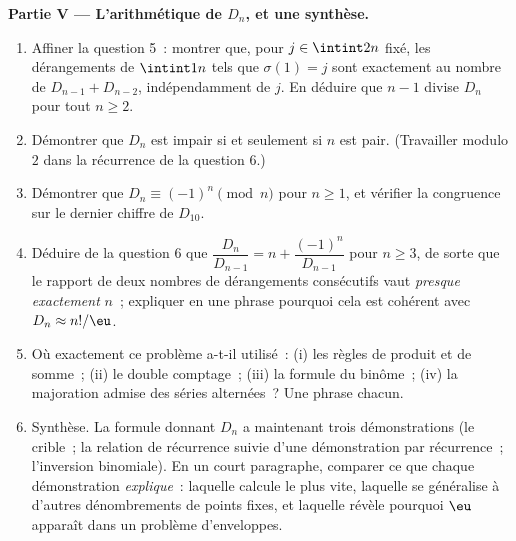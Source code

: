 \begin{problem}
\medskip
\noindent\textbf{Partie V --- L'arithmétique de $D_n$, et une
synthèse.}
\begin{enumerate}[resume]
  \item Affiner la question 5~: montrer que, pour $j \in
        \intint2n$ fixé, les dérangements de $\intint1n$ tels que
        $\sigma(1) = j$ sont exactement au nombre de $D_{n-1} + D_{n-2}$,
        indépendamment de $j$. En déduire que $n - 1$ divise $D_n$
        pour tout $n \geq 2$.
  \item Démontrer que $D_n$ est impair si et seulement si $n$ est pair.
        (Travailler modulo $2$ dans la récurrence de la question 6.)
  \item Démontrer que $D_n \equiv (-1)^n \pmod n$ pour $n \geq 1$, et
        vérifier la congruence sur le dernier chiffre de $D_{10}$.
  \item Déduire de la question 6 que $\dfrac{D_n}{D_{n-1}} = n +
        \dfrac{(-1)^n}{D_{n-1}}$ pour $n \geq 3$, de sorte que le
        rapport de deux nombres de dérangements consécutifs vaut
        \emph{presque exactement} $n$~; expliquer en une phrase pourquoi
        cela est cohérent avec $D_n \approx n!/\eu$.
  \item Où exactement ce problème a-t-il utilisé~: (i) les règles de
        produit et de somme~; (ii) le double comptage~; (iii) la formule
        du binôme~; (iv) la majoration admise des séries alternées~? Une
        phrase chacun.
  \item Synthèse. La formule donnant $D_n$ a maintenant trois
        démonstrations (le crible~; la relation de récurrence suivie
        d'une démonstration par récurrence~; l'inversion binomiale).
        En un court paragraphe, comparer
        ce que chaque démonstration \emph{explique}~: laquelle calcule le
        plus vite, laquelle se généralise à d'autres dénombrements de
        points fixes, et laquelle révèle pourquoi $\eu$ apparaît dans un
        problème d'enveloppes.
\end{enumerate}
\end{problem}
